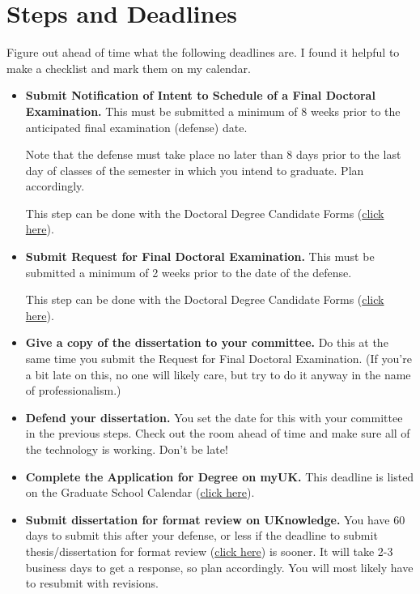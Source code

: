 \documentclass[final]{ukthesis} %
\begin{document}
\section{Steps and Deadlines}

Figure out ahead of time what the following deadlines are. I found it helpful to make a checklist and mark them on my calendar.

\begin{itemize}

\item \textbf{Submit Notification of Intent to Schedule of a Final Doctoral Examination.} This must be submitted a minimum of 8 weeks prior to the anticipated final examination (defense) date.

Note that the defense must take place no later than 8 days prior to the last day of classes of the semester in which you intend to graduate. Plan accordingly.

This step can be done with the Doctoral Degree Candidate Forms (\href{https://ris.uky.edu/cfdocs/gs/DoctoralCommittee/Selection_Screen.cfm}{click here}).

\item \textbf{Submit Request for Final Doctoral Examination.} This must be submitted a minimum of 2 weeks prior to the date of the defense.

This step can be done with the Doctoral Degree Candidate Forms (\href{https://ris.uky.edu/cfdocs/gs/DoctoralCommittee/Selection_Screen.cfm}{click here}).

\item \textbf{Give a copy of the dissertation to your committee.} Do this at the same time you submit the Request for Final Doctoral Examination. (If you're a bit late on this, no one will likely care, but try to do it anyway in the name of professionalism.)

\item \textbf{Defend your dissertation.} You set the date for this with your committee in the previous steps. Check out the room ahead of time and make sure all of the technology is working. Don't be late!

\item \textbf{Complete the Application for Degree on myUK.} This deadline is listed on the Graduate School Calendar (\href{http://gradschool.uky.edu/key-dates}{click here}).

\item \textbf{Submit dissertation for format review on UKnowledge.} You have 60 days to submit this after your defense, or less if the deadline to submit thesis/dissertation for format review (\href{http://gradschool.uky.edu/key-dates}{click here}) is sooner. It will take 2-3 business days to get a response, so plan accordingly. You will most likely have to resubmit with revisions.


\end{itemize}
\end{document}
